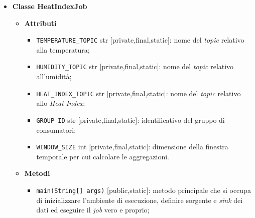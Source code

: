 \begin{itemize}
	\item \textbf{Classe HeatIndexJob}
	      \begin{itemize}
		      \item \textbf{Attributi}
		            \begin{itemize}
			            \item \texttt{TEMPERATURE\_TOPIC} str [private,final,static]: nome del \textit{topic} relativo alla temperatura;
			            \item \texttt{HUMIDITY\_TOPIC} str [private,final,static]: nome del \textit{topic} relativo all'umidità;
			            \item \texttt{HEAT\_INDEX\_TOPIC} str [private,final,static]: nome del \textit{topic} relativo allo \textit{Heat Index};
			            \item \texttt{GROUP\_ID} str [private,final,static]: identificativo del gruppo di consumatori;
			            \item \texttt{WINDOW\_SIZE} int [private,final,static]: dimensione della finestra temporale per cui calcolare le aggregazioni.
		            \end{itemize}
		      \item \textbf{Metodi}
		            \begin{itemize}
			            \item \texttt{main(String[] args)} [public,static]: metodo principale che si occupa di inizializzare l'ambiente di esecuzione, definire sorgente e \textit{sink} dei dati ed eseguire il \textit{job} vero e proprio;


\end{itemize}
\end{itemize}
\end{itemize}
